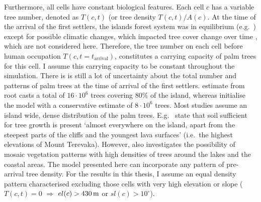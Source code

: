 
Furthermore, all cells have constant biological features.%
Each cell $c$ has a variable tree number, denoted as $T(c,t)$ (or tree density $T(c,t)/A(c)$.
At the time of the arrival of the first settlers, the islands forest system was in equilibrium (e.g.\ \citet{Brander1998}) except for possible climatic changes, which impacted tree cover change over time \citep{Rull2020}, which are not considered here. 
Therefore, the tree number on each cell before human occupation $T(c,t=t_\text{arrival})$, constitutes a carrying capacity of palm trees for this cell. 
I assume this carrying capacity to be constant throughout the simulation.
There is is still a lot of uncertainty about the total number and patterns of palm trees at the time of arrival of the first settlers. 
\citet{MiethBork2015} estimate from root casts a total of $16\cdot 10^6$ trees covering $80\%$ of the island, whereas \citet{Brandt2015} initialise the model with a conservative estimate of $8\cdot 10^6$ trees. 
Most studies assume an island wide, dense distribution of the palm trees. 
E.g.\ \citet{Bahn2017} state that soil sufficient for tree growth is present `almost everywhere on the island, apart from the steepest parts of the cliffs and the youngest lava surfaces' (i.e.\ the highest elevations of Mount Terevaka). 
However, \citet{Rull2020} also investigates the possibility of mosaic vegetation patterns with high densities of trees around the lakes and the coastal areas.
The model presented here can incorporate any pattern of pre-arrival tree density. 
For the results in this thesis, I assume an equal density pattern characterised excluding those cells with very high elevation or slope ($T(c,t) = 0$ $\Rightarrow$ $el(c)>430\, {\rm m}$ or $sl(c)>10^\circ$).
